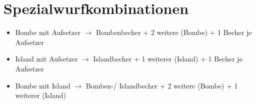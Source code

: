 \documentclass[a4paper,11pt]{scrartcl}
\begin{document}
\section{Spezialwurfkombinationen}
    \begin{itemize}
        \item
            Bombe mit Aufsetzer $\rightarrow$ Bombenbecher + 2 weitere (Bombe) + 1 Becher je Aufsetzer
        \item
            Island mit Aufsetzer $\rightarrow$ Islandbecher + 1 weiterer (Island) + 1 Becher je Aufsetzer
        \item
            Bombe mit Island $\rightarrow$ Bomben-/ Islandbecher + 2 weitere (Bombe) + 1 weiterer (Island)
    \end{itemize}
\end{document}
